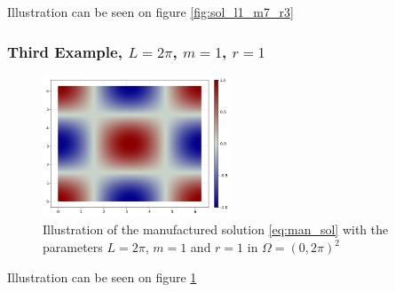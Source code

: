Illustration can be seen on figure \ref{fig:sol_l1_m7_r3}

\subsubsection{Third Example, $L=2 \pi $, $m=1$, $r=1$}%
\label{sub:first_example}
\begin{figure}[tbh!]
    \centering
    \includegraphics[width=0.5\textwidth]{figures/model/l_6.28_m_1_r_1n_100_sol.png}
    \caption{Illustration of the manufactured solution \eqref{eq:man_sol}   with the parameters $L=2\pi$, $m=1$ and $r=1$ in $\Omega = (0,2\pi)^2$}
    \label{fig:sol_l2pi_m1_r1}
\end{figure}

Illustration can be seen on figure \ref{fig:sol_l2pi_m1_r1}








